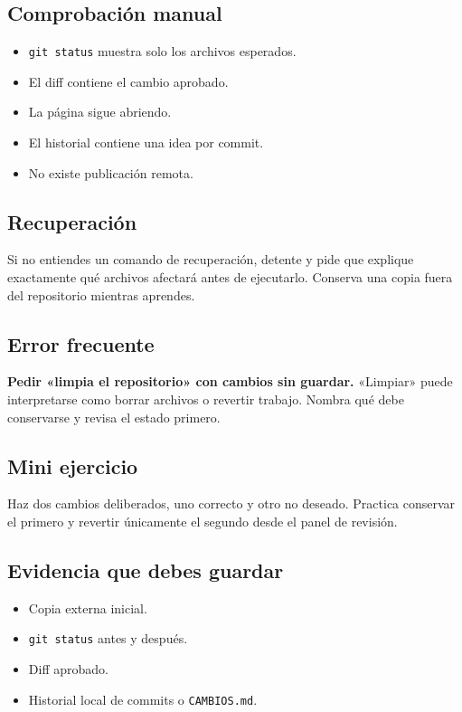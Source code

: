 \documentclass[10pt,a4paper,openany]{book}
\providecommand{\tightlist}{\setlength{\itemsep}{0.18em}\setlength{\parskip}{0pt}}
\begin{document}
\subsection{Comprobación manual}\label{comprobaciuxf3n-manual-9}

\begin{itemize}
\tightlist
\item
  \texttt{git\ status} muestra solo los archivos esperados.
\item
  El diff contiene el cambio aprobado.
\item
  La página sigue abriendo.
\item
  El historial contiene una idea por commit.
\item
  No existe publicación remota.
\end{itemize}

\subsection{Recuperación}\label{recuperaciuxf3n-12}

Si no entiendes un comando de recuperación, detente y pide que explique
exactamente qué archivos afectará antes de ejecutarlo. Conserva una
copia fuera del repositorio mientras aprendes.

\subsection{Error frecuente}\label{error-frecuente-14}

\textbf{Pedir «limpia el repositorio» con cambios sin guardar.}
«Limpiar» puede interpretarse como borrar archivos o revertir trabajo.
Nombra qué debe conservarse y revisa el estado primero.

\subsection{Mini ejercicio}\label{mini-ejercicio-10}

Haz dos cambios deliberados, uno correcto y otro no deseado. Practica
conservar el primero y revertir únicamente el segundo desde el panel de
revisión.

\subsection{Evidencia que debes
guardar}\label{evidencia-que-debes-guardar-14}

\begin{itemize}
\tightlist
\item
  Copia externa inicial.
\item
  \texttt{git\ status} antes y después.
\item
  Diff aprobado.
\item
  Historial local de commits o \texttt{CAMBIOS.md}.
\end{itemize}
\end{document}
